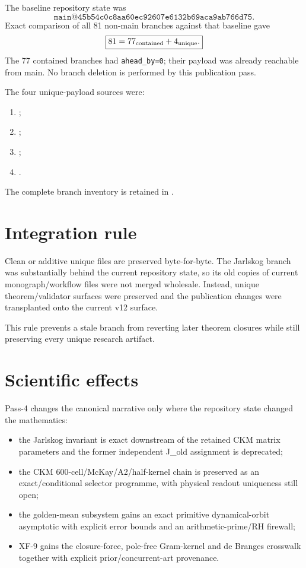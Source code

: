 \documentclass[11pt,a4paper,twoside]{book}
\def\({}%
\def\){}%
\theoremstyle{definition}
\begin{document}
The baseline repository state was
\[
\boxed{\texttt{main@45b54c0c8aa60ec92607e6132b69aca9ab766d75}.}
\]
Exact comparison of all 81 non-main branches against that baseline gave
\[
\boxed{
81=77_{\rm contained}+4_{\rm unique}.
}
\]
The 77 contained branches had \texttt{ahead\_by=0}; their payload was already
reachable from main.  No branch deletion is performed by this publication
pass.

The four unique-payload sources were:
\begin{enumerate}
\item {};
\item {};
\item {};
\item {}.
\end{enumerate}
The complete branch inventory is retained in
.

\section{Integration rule}

Clean or additive unique files are preserved byte-for-byte.  The Jarlskog branch
was substantially behind the current repository state, so its old copies of
current monograph/workflow files were not merged wholesale.  Instead, unique
theorem/validator surfaces were preserved and the publication changes were
transplanted onto the current v12 surface.

This rule prevents a stale branch from reverting later theorem closures while
still preserving every unique research artifact.

\section{Scientific effects}

Pass-4 changes the canonical narrative only where the repository state changed
the mathematics:
\begin{itemize}
\item the Jarlskog invariant is exact downstream of the retained CKM matrix
      parameters and the former independent \(J_{\rm old}\) assignment is
      deprecated;
\item the CKM 600-cell/McKay/A2/half-kernel chain is preserved as an
      exact/conditional selector programme, with physical readout uniqueness
      still open;
\item the golden-mean subsystem gains an exact primitive dynamical-orbit
      asymptotic with explicit error bounds and an arithmetic-prime/RH
      firewall;
\item XF-9 gains the closure-force, pole-free Gram-kernel and de Branges
      crosswalk together with explicit prior/concurrent-art provenance.
\end{itemize}
\end{document}
